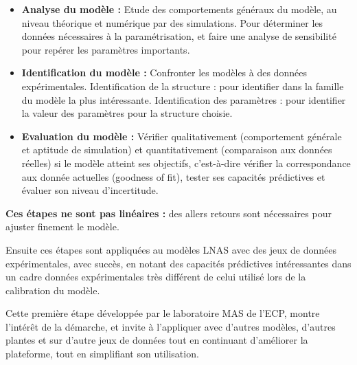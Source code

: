 \begin{itemize}

\item \textbf{Analyse du modèle :} Etude des comportements généraux du modèle, au niveau théorique et numérique par des simulations. Pour déterminer les données nécessaires à la paramétrisation, et faire une analyse de sensibilité pour repérer les paramètres importants.
\item \textbf{Identification du modèle :} Confronter les modèles à des données expérimentales. Identification de la structure : pour identifier dans la famille du modèle la plus intéressante. Identification des paramètres : pour identifier la valeur des paramètres pour la structure choisie.
\item \textbf{Evaluation du modèle :} Vérifier qualitativement (comportement générale et aptitude de simulation) et quantitativement (comparaison aux données réelles) si le modèle atteint ses objectifs, c’est-à-dire vérifier la correspondance aux donnée actuelles (goodness of fit), tester ses capacités prédictives et évaluer son niveau d’incertitude.

\end{itemize}

\textbf{Ces étapes ne sont pas linéaires :} des allers retours sont nécessaires pour ajuster finement le modèle.

Ensuite ces étapes sont appliquées au modèles LNAS avec des jeux de données expérimentales, avec succès, en notant des capacités prédictives intéressantes dans un cadre données expérimentales très différent de celui utilisé lors de la calibration du modèle.

Cette première étape développée par le laboratoire MAS de l’ECP, montre l’intérêt de la démarche, et invite à l’appliquer avec d’autres modèles, d’autres plantes et sur d’autre jeux de données tout en continuant d’améliorer la plateforme, tout en simplifiant son utilisation.
